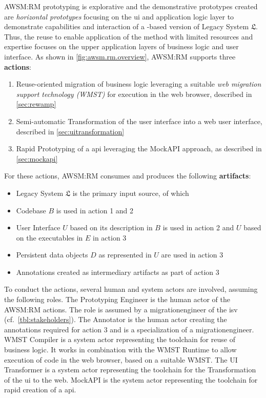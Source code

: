 AWSM:RM prototyping is explorative and the demonstrative prototypes created are \emph{horizontal prototypes} \autocite{Wallmueller2001SoftwareQuality} focusing on the \gls{ui} and application logic layer to demonstrate capabilities and interaction of a -based version of \gls{Legacy System} \(\mathfrak{L}\).
Thus, the reuse to enable application of the method with limited resources and expertise focuses on the upper application layers of business logic and user interface.
As shown in \cref{fig:awsm.rm.overview}, AWSM:RM supports three \textbf{actions}:

\begin{enumerate}
\def\labelenumi{\arabic{enumi}.}
\tightlist
\item
  Reuse-oriented migration of  business logic leveraging a suitable \emph{web migration support technology (WMST)} for execution in the \gls{web} browser, described in \cref{sec:rewamp}
\item
  Semi-automatic \gls{Transformation} of the  user interface into a \gls{web} user interface, described in \cref{sec:uitransformation}
\item
  \gls{Rapid Prototyping} of a  \gls{api} leveraging the MockAPI approach, as described in \cref{sec:mockapi}
\end{enumerate}

For these actions, AWSM:RM consumes and produces the following \textbf{artifacts}:

\begin{itemize}
\tightlist
\item
  \gls{Legacy System} \(\mathfrak{L}\) is the primary input source, of which
\item
  Codebase \(B\) is used in action 1 and 2
\item
  User Interface \(U\) based on its description in \(B\) is used in action 2 and \(U\) based on the  executables in \(E\) in action 3
\item
  Persistent data objects \(D\) as represented in \(U\) are used in action 3
\item
  Annotations created as intermediary artifacts as part of action 3
\end{itemize}

To conduct the actions, several human and system actors are involved, assuming the following roles.
The Prototyping Engineer is the human actor of the AWSM:RM actions.
The role is assumed by a \gls{migrationengineer} of the \gls{isv} (cf.~\cref{tbl:stakeholders}).
The Annotator is the human actor creating the annotations required for action 3 and is a specialization of a \gls{migrationengineer}.
WMST Compiler is a system actor representing the toolchain for reuse of business logic.
It works in combination with the WMST Runtime to allow execution of  code in the \gls{web} browser, based on a suitable WMST.
The UI Transformer is a system actor representing the toolchain for the \gls{Transformation} of the  \gls{ui} to the \gls{web}.
MockAPI is the system actor representing the toolchain for rapid creation of a  \gls{api}.

